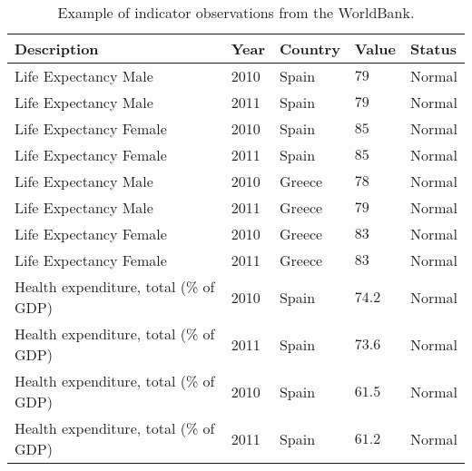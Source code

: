 \begin{table}[!htb]
\renewcommand{\arraystretch}{1.3}
\scriptsize
\begin{center}
\begin{tabular}{|p{5.5cm}|p{1cm}|p{2cm}|p{1cm}|p{1.5cm}|}
\hline
  \textbf{Description} & \textbf{Year} & \textbf{Country} & \textbf{Value} & \textbf{Status} \\  \hline
  Life Expectancy Male & 2010 & Spain & $79$ & Normal \\ \hline
  Life Expectancy Male & 2011 & Spain & $79$ & Normal\\ \hline
  Life Expectancy Female & 2010 & Spain & $85$ & Normal\\ \hline
  Life Expectancy Female & 2011 & Spain & $85$ & Normal\\ \hline
  Life Expectancy Male & 2010 & Greece & $78$ & Normal\\ \hline
  Life Expectancy Male & 2011 & Greece & $79$ & Normal\\ \hline
  Life Expectancy Female & 2010 & Greece & $83$ & Normal\\ \hline
  Life Expectancy Female & 2011 & Greece & $83$ & Normal\\ \hline
  Health expenditure, total (\% of GDP) & 2010 & Spain & $74.2$ & Normal\\ \hline
  Health expenditure, total (\% of GDP) & 2011 & Spain & $73.6$ & Normal\\ \hline
  Health expenditure, total (\% of GDP) & 2010 & Spain & $61.5$ & Normal\\ \hline
  Health expenditure, total (\% of GDP) & 2011 & Spain & $61.2$ & Normal\\ \hline
  \hline
  \end{tabular}
  \caption{Example of indicator observations from the WorldBank.}
  \label{tab:example-wb}
  \end{center}	 
\end{table} 




	 	


